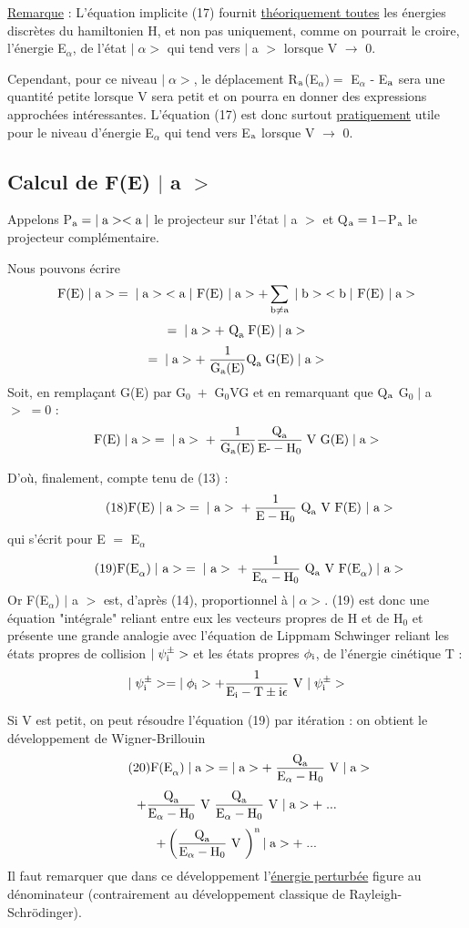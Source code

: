 \ul{Remarque} : L'équation implicite (17) fournit \ul{théoriquement toutes} les énergies
discrètes du hamiltonien H, et non pas uniquement, comme on pourrait le croire,
l'énergie E$_\alpha$, de l'état $|\;\alpha>$ qui tend vers $|$ a $>$ lorsque V $\to$ 0.

Cependant, pour ce niveau $|\;\alpha>$, le déplacement R$_{\text{a}}$(E$_\alpha) =$ E$_\alpha$ - E$_{\text{a}}$
sera une quantité petite lorsque V sera petit et on pourra en donner des
expressions approchées intéressantes. L'équation (17) est donc surtout \ul{pratiquement}
utile pour le niveau d'énergie E$_\alpha$ qui tend vers E$_{\text{a}}$ lorsque V $\to$ 0.
\subsection{Calcul de F(E) $|$ a $>$}%
Appelons P$_{\text{a}}=|\;\text{a}><\text{a}\;|$ le projecteur sur l'état $|$ a $>$ et
Q$_{\text{a}}=1-$P$_{\text{a}}$ le projecteur complémentaire.

Nous pouvons écrire
\[
\text{F(E)}\;|\;\text{a}>\;=\;|\;\text{a}>\;<\text{a}\;|\text{ F(E) }|\;\text{a}>+\sum_{\text{b}\neq\text{a}}\;|\;\text{b}>\;<\text{b}\;|\text{ F(E) }|\;\text{a}>
\]
\[
=\;|\;\text{a}>+\text{ Q}_{\text{a}}\;\text{F(E)}\;|\;\text{a}>
\]
\[
=\;|\;\text{a}>+\;\frac{1}{\text{G}_{\text{a}}\text{(E)}}\text{Q}_{\text{a}}\;\text{G(E)}\;|\;\text{a}>
\]
Soit, en remplaçant G(E) par G$_0\;+$ G$_0$VG  et en remarquant que Q$_{\text{a}}$ G$_0\;|$ a $>\;=0$ :
\[
\text{F(E)}\;|\;\text{a}>\;=\;|\;\text{a}>\;+\;\frac{1}{\text{G}_{\text{a}}\text{(E)}}
\frac{\text{Q}_{\text{a}}}{\text{E-}-\text{H}_0}\;\text{V G(E)}\;|\;\text{a}>
\]

D'où, finalement, compte tenu de (13) :
\[
\tag{18}\text{F(E) }|\;\text{a}>\;=\;|\text{ a}>\;+\;
\frac{1}{\text{E}-\text{H}_0}\text{ Q}_{\text{a}}\text{ V F(E) }|\text{ a}>
\]
qui s'écrit pour E $=$ E$_\alpha$
\[
\tag{19}\text{F(E}_\alpha)\;|\text{ a}>\;=\;|\text{ a}>\;+\;
\frac{1}{\text{E}_\alpha-\text{H}_0}\text{ Q}_{\text{a}}\text{ V F(E}_\alpha)\;|\text{ a}>
\]
Or F(E$_\alpha$) $|$ a $>$ est, d'après (14), proportionnel à $|\;\alpha>$. (19) est donc une
équation "intégrale" reliant entre eux les vecteurs propres de H et de H$_0$ et
présente une grande analogie avec l'équation de Lippmam Schwinger reliant les
états propres de collision $|\;\psi_{\text{i}}^\pm>$ et les états propres $\phi_{\text{i}}$, de l'énergie cinétique T :
\[
|\;\psi_{\text{i}}^\pm>=|\;\phi_{\text{i}}>+\frac{1}{\text{E}_{\text{i}}-\text{T}\pm\text{i}\epsilon}\text{ V }|\;\psi_{\text{i}}^\pm>
\]

Si V est petit, on peut résoudre l'équation (19) par itération : on obtient
le développement de Wigner-Brillouin
\[
\tag{20}\text{F(E}_\alpha)\;|\;\text{a}>\;=|\;\text{a}>+\;\frac{\text{Q}_{\text{a}}}{\text{E}_\alpha-\text{H}_0}\text{ V }|\;\text{a}>
\]
\[
+\frac{\text{Q}_{\text{a}}}{\text{E}_\alpha-\text{H}_0}\text{ V }\frac{\text{Q}_{\text{a}}}{\text{E}_\alpha-\text{H}_0}\text{ V }|\;\text{a}>+\;...
\]
\[
+\left(\frac{\text{Q}_{\text{a}}}{\text{E}_\alpha-\text{H}_0}\text{ V }\right)^{\text{n}}|\;\text{a}>+\;...
\]
Il faut remarquer que dans ce développement l'\ul{énergie perturbée} figure au
dénominateur (contrairement au développement classique de Rayleigh-Schrödinger).

